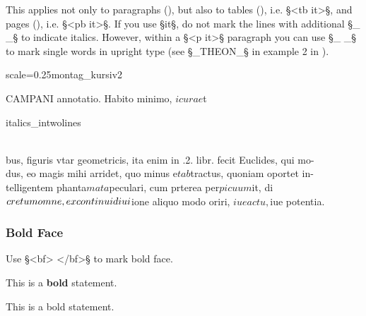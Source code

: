\begin{clarification}
This applies not only to paragraphs (), but also to tables (), i.e. §<tb it>§, and pages (), i.e. §<pb it>§. If you use §it§, do not mark the lines with additional §_ _§ to indicate italics. However, within a §<p it>§ paragraph you can use §_ _§ to mark single words in upright type (see §_THEON_§ in example 2 in ).
\end{clarification}

\begin{sampleImageSmall}{scale=0.25}{montag_kursiv2}
\begin{typeLatin}
CAMPANI \bold{_}annotatio\bold{_}. Habito minimo, $i cura e$t
\end{typeLatin}
\end{sampleImageSmall}

\begin{sampleImage}{italics_intwolines}
\begin{typeLatin}
 \someText\\
bus, figuris vtar geometricis, ita enim in .2. libr. fecit Euclides, qui mo-\\
dus, eo magis mihi arridet, quo minus e$t ab$tractus, \bold{_}quoniam oportet in-\bold{_}\\
\bold{_}telligentem phanta$mata $peculari\bold{_}, cum prterea per$picuum $it, di$cretum\\
omne, ex continui diui$ione aliquo modo oriri, $iue actu, $iue potentia.\\
\someText {}
\end{typeLatin}
\end{sampleImage}


\subsubsection{Bold Face}
\label{section bold face}

\begin{mainruleLessImportant}
Use §<bf> </bf>§ to mark bold face.
\end{mainruleLessImportant}

\begin{example}

\vspace{-4mm}
This is a \textbf{bold}  statement.

\begin{typeLatin}
This is a bold statement.
\end{typeLatin}
\end{example}

